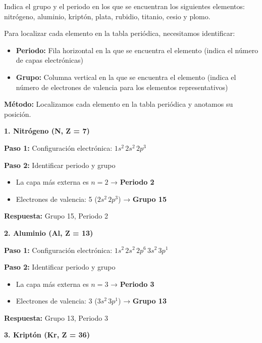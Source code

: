 \begin{exercise}
    Indica el grupo y el periodo en los que se encuentran los siguientes elementos: nitrógeno, aluminio, kriptón, plata, rubidio, titanio, cesio y plomo.
    \begin{solu}
        Para localizar cada elemento en la tabla periódica, necesitamos identificar:
        \begin{itemize}
            \item \textbf{Periodo:} Fila horizontal en la que se encuentra el elemento (indica el número de capas electrónicas)
            \item \textbf{Grupo:} Columna vertical en la que se encuentra el elemento (indica el número de electrones de valencia para los elementos representativos)
        \end{itemize}

        \textbf{Método:} Localizamos cada elemento en la tabla periódica y anotamos su posición.

        \textbf{1. Nitrógeno (N, Z = 7)}

        \textbf{Paso 1:} Configuración electrónica: \(1s^2 \, 2s^2 \, 2p^3\)

        \textbf{Paso 2:} Identificar periodo y grupo
        \begin{itemize}
            \item La capa más externa es \(n = 2\) → \textbf{Periodo 2}
            \item Electrones de valencia: 5 (\(2s^2 \, 2p^3\)) → \textbf{Grupo 15}
        \end{itemize}

        \textbf{Respuesta:} Grupo 15, Periodo 2

        \textbf{2. Aluminio (Al, Z = 13)}

        \textbf{Paso 1:} Configuración electrónica: \(1s^2 \, 2s^2 \, 2p^6 \, 3s^2 \, 3p^1\)

        \textbf{Paso 2:} Identificar periodo y grupo
        \begin{itemize}
            \item La capa más externa es \(n = 3\) → \textbf{Periodo 3}
            \item Electrones de valencia: 3 (\(3s^2 \, 3p^1\)) → \textbf{Grupo 13}
        \end{itemize}

        \textbf{Respuesta:} Grupo 13, Periodo 3

        \textbf{3. Kriptón (Kr, Z = 36)}


\end{solu}
\end{exercise}

